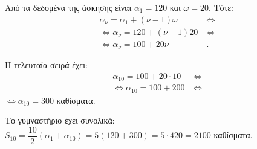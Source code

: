 
\begin{alist}
\item Από τα δεδομένα της άσκησης είναι $\alpha_1 = 120$ και $\omega = 20$. Τότε:
\begin{align*}
\alpha_\nu = \alpha_1 + (\nu - 1)\omega \ &\Leftrightarrow \\
\Leftrightarrow \alpha_\nu = 120 + (\nu - 1)20 \ &\Leftrightarrow \\
\Leftrightarrow \alpha_\nu = 100 + 20\nu&.
\end{align*}

\item Η τελευταία σειρά έχει:
\begin{align*}
\alpha_{10} = 100 + 20 \cdot 10 \ &\Leftrightarrow \\
\Leftrightarrow \alpha_{10} = 100 + 200 \ &\Leftrightarrow
\end{align*}
$\Leftrightarrow \alpha_{10} = 300$ καθίσματα.

\item Το γυμναστήριο έχει συνολικά:
$S_{10} = \dfrac{10}{2}(\alpha_1 + \alpha_{10}) = 5(120 + 300) = 5 \cdot 420 = 2100$ καθίσματα.
\end{alist}

